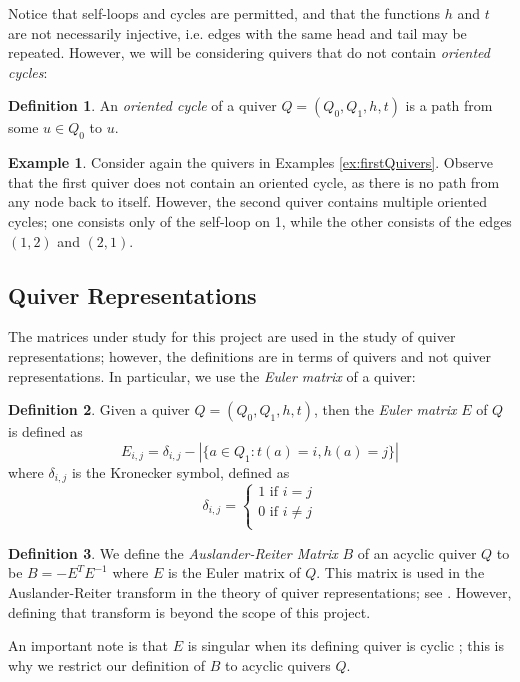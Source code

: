 \documentclass{amsart}
\theoremstyle{theorem}
\theoremstyle{theorem*}
\theoremstyle{definition}
\newtheorem{example}[theorem]{Example}
\newtheorem{definition}{Definition}
\begin{document}
Notice that self-loops and cycles are permitted, and that the functions $h$ and
$t$ are not necessarily injective, i.e. edges with the same head and tail may be
repeated. However, we will be considering quivers that do not contain
\textit{oriented cycles}:

\begin{definition} \cite{dw} An \textit{oriented cycle} of a quiver $Q = (Q_0,
        Q_1, h, t)$ is a path from some $u \in Q_0$ to $u$.
\end{definition}

\begin{example}
    Consider again the quivers in Examples \ref{ex:firstQuivers}. Observe that the first quiver
    does not contain an oriented cycle, as there is no path from
    any node back to itself. However, the second quiver contains multiple
    oriented cycles; one consists only of the self-loop on 1, while the other
    consists of the edges $(1,2)$ and $(2,1)$.
\end{example}

\subsection{Quiver Representations}

The matrices under study for this project are used in the study of quiver
representations; however, the definitions are in terms of quivers and not
quiver representations. In particular, we use the \textit{Euler matrix}
of a quiver:

\begin{definition} \cite{dw} Given a quiver $Q = (Q_0, Q_1, h, t)$, then the
    \textit{Euler matrix} $E$ of $Q$ is defined as
    $$E_{i,j} = \delta_{i,j} - |\{a \in Q_1 : t(a) = i, h(a) = j \}|$$
    where $\delta_{i,j}$ is the Kronecker symbol, defined as
    $$\delta_{i,j} = \begin{cases} 1 \text{ if } i = j \\ 0 \text{ if } i \neq j
            \\\end{cases}$$
\end{definition}

\begin{definition} We define the \textit{Auslander-Reiter Matrix} $B$ of an acyclic
    quiver $Q$ to be $B = - E^T E^{-1}$ where $E$ is the Euler matrix of $Q$.
    This matrix is used in the Auslander-Reiter transform in the theory of quiver
    representations; see \cite{dw}. However, defining that transform is beyond
    the scope of this project.

    An important note is that $E$ is singular when its defining quiver is cyclic
    \cite{dp}; this is why we restrict our definition of $B$ to acyclic quivers
    $Q$.
\end{definition}
\end{document}
